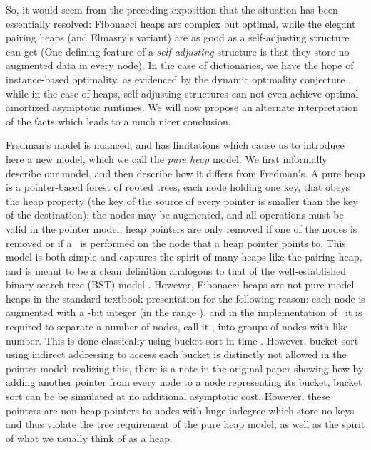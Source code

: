 So, it would seem from the preceding exposition that the situation has been essentially resolved: Fibonacci heaps are complex but optimal, while the elegant pairing heaps (and Elmasry's variant) are as good as a self-adjusting structure can get (One defining feature of a \emph{self-adjusting} structure is that they store no augmented data in every node). In the case of dictionaries, we have the hope of instance-based optimality, as evidenced by the dynamic optimality conjecture \cite{DBLP:journals/jacm/SleatorT85}, while in the case of heaps, self-adjusting structures can not even achieve optimal amortized asymptotic runtimes. We will now propose an alternate interpretation of the facts which leads to a much nicer conclusion.

Fredman's model is nuanced, and has limitations which cause us to introduce here a new model, which we call the \emph{pure heap} model. We first informally describe our model, and then describe how it differs from Fredman's.
A pure heap is a pointer-based forest of rooted trees, each node holding one key, that obeys the heap property (the key of the source of every pointer is smaller than the key of the destination); the nodes may be augmented, and all operations must be valid in the pointer model; heap pointers are only removed if one of the nodes is removed or if a \opDc\ is performed on the node that a heap pointer points to. 
This model is both simple and captures the spirit of many heaps  like the pairing heap, and is meant to be a clean definition analogous to that of the well-established binary search tree (BST) model \cite{DBLP:journals/siamcomp/Wilber89}.
However, Fibonacci heaps are not pure model heaps in the standard textbook presentation \cite{clrs} for the following reason: each node is augmented with a -bit integer (in the range ), and in the implementation of \opEm\ it is required to separate a number of nodes, call it , into groups of nodes with like number. This is done classically using bucket sort in time . However, bucket sort using indirect addressing to access each bucket is distinctly not allowed in the pointer model; realizing this, there is a note in the original paper \cite{DBLP:journals/jacm/FredmanT87}  showing how by adding another pointer from every node to a node representing its bucket, bucket sort can be be simulated at no additional asymptotic cost. However, these pointers are non-heap pointers to nodes with huge indegree which store no keys and thus violate the tree requirement of the pure heap model, as well as the spirit of what we usually think of as a heap. 

